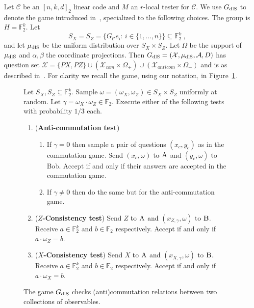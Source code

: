 \documentclass[11pt]{article}
\theoremstyle{definition}
\newcommand{\code}{\mathcal{C}}
\newcommand{\field}{\mathbb{F}_2}
\newcommand{\dlS}{\ensuremath{\rm dlS}}
\newcommand{\mA}{\ensuremath{\mathcal{A}}}
\newcommand{\mX}{\ensuremath{\mathcal{X}}}
\newcommand{\labelstyle}[1]{\ensuremath{\textsc{#1}}\xspace}
\newcommand{\alice}{\labelstyle{A}}
\newcommand{\bob}{\labelstyle{B}}
\newenvironment{gamespec}{
  \begin{mdframed}[style=figstyle]}{
  \end{mdframed}}
\begin{document}
Let $\code$ be an $[n,k,d]_2$ linear code and $M$ an $r$-local tester for $\code$. 
We use $G_{\dlS}$ to denote the game introduced in~\cite[Section 3.4]{de2022spectral}, specialized to the following choices. The group is $H=\field^k$. Let
\[ S_X=S_Z=\{G_\code e_i:\,i\in\{1,\ldots,n\}\}\subseteq \field^k\;,\]
and let $\mu_{\dlS}$ be the uniform distribution over $S_X\times S_Z$. Let $\Omega$ be the support of $\mu_{\dlS}$ and $\alpha,\beta$ the coordinate projections. Then $G_{\dlS}=(\mX,\mu_{\dlS},\mA,D)$ has question set $\mX = \{PX,PZ\} \cup (\mX_{com}\times \Omega_+) \cup (\mX_{anticom} \times \Omega_-)$ and is as described in~\cite[Section 3.4]{de2022spectral}. For clarity we recall the game, using our notation, in Figure~\ref{fig:dlS}. 

\begin{figure}[!htbp]
  \centering
  \begin{gamespec}
Let $S_X,S_Z\subseteq \field^k$.  Sample $\omega = (\omega_X,\omega_Z)\in S_X \times S_Z $ uniformly at random. Let $\gamma = \omega_X \cdot \omega_Z \in \field$. Execute either of the following tests with probability $1/3$ each. 
    \begin{enumerate}
      \setlength\itemsep{1pt}
    \item (\textbf{Anti-commutation test}) 
		\begin{enumerate}
		\item If $\gamma=0$ then sample a pair of questions $(x_c,y_c)$ as in the commutation game. Send $(x_c,\omega)$ to $\alice$ and $(y_c,\omega)$ to Bob. Accept if and only if their answers are accepted in the commutation game. 
		\item If $\gamma\neq 0$ then do the same but for the anti-commutation game. 
		\end{enumerate} 
		 \item (\textbf{$Z$-Consistency test}) Send $Z$ to $\alice$ and $(x_{Z,\gamma},\omega)$ to $\bob$. Receive $a\in \field^k$ and $b\in \field$ respectively. Accept if and only if $a\cdot \omega_Z=b$. 
		 \item (\textbf{$X$-Consistency test}) Send $X$ to $\alice$ and $(x_{X,\gamma},\omega)$ to $\bob$. Receive $a\in \field^k$ and $b\in \field$ respectively. Accept if and only if $a\cdot \omega_X=b$. 
    \end{enumerate}
  \end{gamespec}
  \caption{The game $G_{\dlS}$ checks (anti)commutation relations between two collections of observables.}
  \label{fig:dlS}
\end{figure}
\end{document}
